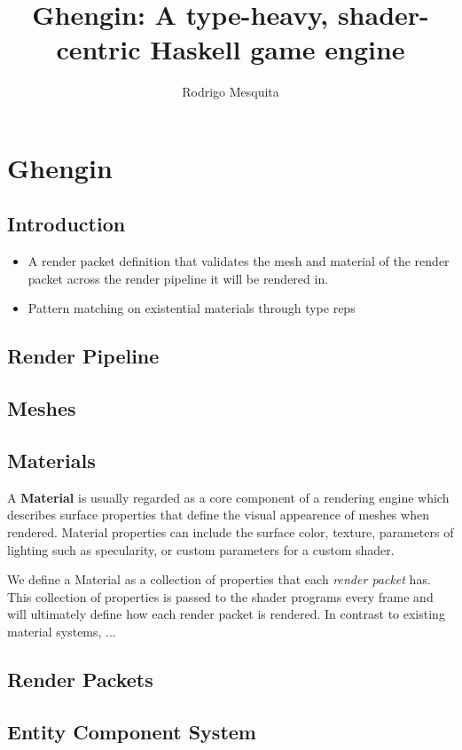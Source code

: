 \documentclass[a4paper,openright]{memoir}
\title{Ghengin: A type-heavy, shader-centric Haskell game engine}
\author{Rodrigo Mesquita}
\begin{document}
\maketitle

\chapter{Ghengin}

\section{Introduction}

\begin{itemize}
  \item A render packet definition that validates the mesh and material of the
    render packet across the render pipeline it will be rendered in.
  \item Pattern matching on existential materials through type reps
\end{itemize}

\section{Render Pipeline}

\section{Meshes}

\section{Materials}

A \textbf{Material} is usually regarded as a core component of a rendering
engine which describes surface properties that define the visual appearence of
meshes when rendered. Material properties can include the surface color,
texture, parameters of lighting such as specularity, or custom parameters for a
custom shader.

We define a Material as a collection of properties that each \emph{render
packet} has. This collection of properties is passed to the shader programs
every frame and will ultimately define how each render packet is rendered. In
contrast to existing material systems, ...

\section{Render Packets}


\section{Entity Component System\label{sec:ecs}}






\end{document}
